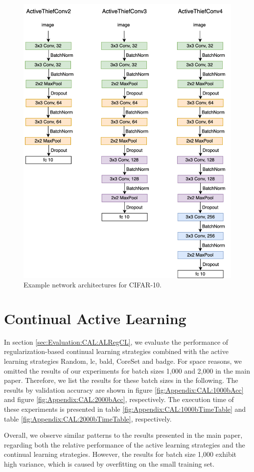 \begin{figure}[!htb]
    \centering
    \includegraphics[width=\linewidth]{images/ActiveThiefConvs.png}
    \caption{Example network architectures for CIFAR-10.}
    \label{fig:ActiveThiefArchitectures}
\end{figure}

\clearpage

\section{Continual Active Learning}
\label{sec:Appendix:ContinualActiveLearning}
In section \ref{sec:Evaluation:CAL:ALRegCL}, we evaluate the performance of regularization-based continual learning strategies combined with the active learning
strategies Random, \gls{lc}, \gls{bald}, CoreSet and \gls{badge}. For space reasons, we omitted the results of our experiments for batch sizes 1,000 and 2,000 in 
the main paper. Therefore, we list the results for these batch sizes in the following. The results by validation accuracy are shown in figure
\ref{fig:Appendix:CAL:1000bAcc} and figure \ref{fig:Appendix:CAL:2000bAcc}, respectively. The execution time of these experiments is presented in table 
\ref{fig:Appendix:CAL:1000bTimeTable} and table \ref{fig:Appendix:CAL:2000bTimeTable}, respectively. \par
Overall, we observe similar patterns to the results presented in the main paper, regarding both the relative performance of the active learning strategies and
the continual learning strategies. However, the results for batch size 1,000 exhibit high variance, which is caused by overfitting on the small training set. 



